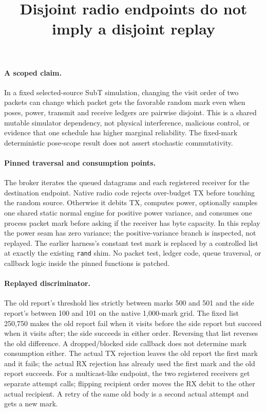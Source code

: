 \documentclass[11pt]{article}
\title{Disjoint radio endpoints do not imply a disjoint replay}
\begin{document}
\maketitle
\paragraph{A scoped claim.}
In a fixed selected-source SubT simulation, changing the visit order
of two packets can change which packet gets the favorable random
mark even when poses, power, transmit and receive ledgers are pairwise
disjoint. This is a shared mutable simulator dependency, not physical
interference, malicious control, or evidence that one schedule
has higher marginal reliability. The fixed-mark deterministic
pose-scope result does not assert stochastic commutativity.

\paragraph{Pinned traversal and consumption points.}
The broker iterates the queued datagrams and each registered receiver
for the destination endpoint. Native radio code rejects over-budget
TX before touching the random source. Otherwise it debits TX,
computes power, optionally samples one shared static normal engine
for positive power variance, and consumes one process packet mark
before asking if the receiver has byte capacity. In this replay
the power seam has zero variance; the positive-variance branch is
inspected, not replayed. The earlier harness's constant test mark
is replaced by a controlled list at exactly the existing
\texttt{rand} shim. No packet test, ledger code, queue traversal,
or callback logic inside the pinned functions is patched.

\paragraph{Replayed discriminator.}
The old report's threshold lies strictly between marks 500 and
501 and the side report's between 100 and 101 on the native
1,000-mark grid. The fixed list 250,750 makes the old report fail
when it visits before the side report but succeed when it visits
after; the side succeeds in either order. Reversing that list
reverses the old difference. A dropped/blocked side callback
does not determine mark consumption either. The actual TX rejection
leaves the old report the first mark and it fails; the actual
RX rejection has already used the first mark and the old
report succeeds. For a multicast-like endpoint, the two registered
receivers get separate attempt calls; flipping recipient order
moves the RX debit to the other actual recipient. A retry of the
same old body is a second actual attempt and gets a new mark.
\end{document}

